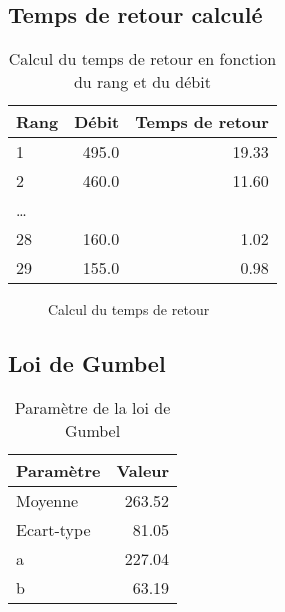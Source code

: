 \subsection{Temps de retour calculé}
\begin{table}[H]
    \centering
    \begin{tabular}{l|r|r}
        \toprule
        \textbf{Rang} & \textbf{Débit} & \textbf{Temps de retour} \\
        \midrule
        1             &          495.0 &                    19.33 \\
        2             &          460.0 &                    11.60 \\
        \dots         &                &                          \\
        28            &          160.0 &                     1.02 \\
        29            &          155.0 &                     0.98 \\
        \bottomrule
    \end{tabular}
    \caption{Calcul du temps de retour en fonction du rang et du débit}
    \label{tab:calcul_tempsRetour}
\end{table}

\begin{figure}[H]
    \centering
    \resizebox*{0.50\textwidth}{!}{
        
    }
    \caption{Calcul du temps de retour}
    \label{graph:calcul_tempsRetour}
\end{figure}

\subsection{Loi de Gumbel}
\begin{table}[H]
    \centering
    \begin{tabular}{l|r}
        \toprule
        \textbf{Paramètre} & \textbf{Valeur} \\
        \midrule
        Moyenne            & 263.52          \\
        Ecart-type         & 81.05           \\
        a                  & 227.04          \\
        b                  & 63.19           \\
        \bottomrule
    \end{tabular}
    \caption{Paramètre de la loi de Gumbel}
    \label{tab:param_Gumbel}
\end{table}

